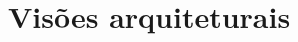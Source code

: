 \documentclass[11pt, a4paper]{article}
\begin{document}
    \section{Visões arquiteturais}
\end{document}
